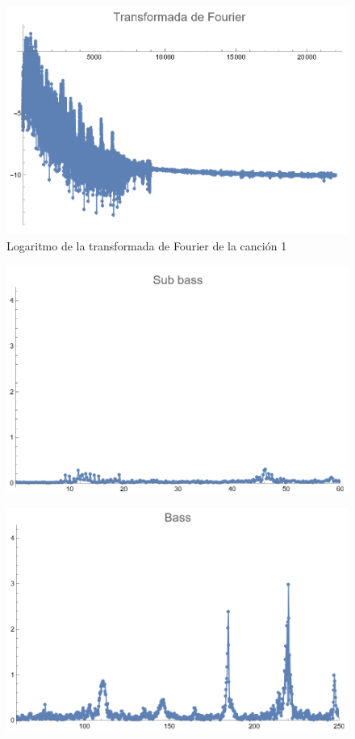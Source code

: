 \documentclass[12pt, letterpaper]{article}
\begin{document}
\begin{figure}[H]
  \centering
  \includegraphics[width=0.7\linewidth]{imgs/Cancion1/transformada.png}
  \caption{Logaritmo de la transformada de Fourier de la canción 1}
  \label{fig:01a}
\end{figure}
\begin{figure}[H]
  \centering
  \begin{minipage}{.5\textwidth}
    \centering
    \includegraphics[width=.9\linewidth]{imgs/Cancion1/subbass.png}
    \label{fig:01b}
  \end{minipage}%
  \begin{minipage}{.5\textwidth}
    \centering
    \includegraphics[width=.9\linewidth]{imgs/Cancion1/bass.png}
    \label{fig:01c}
  \end{minipage}
\end{figure}
\end{document}
